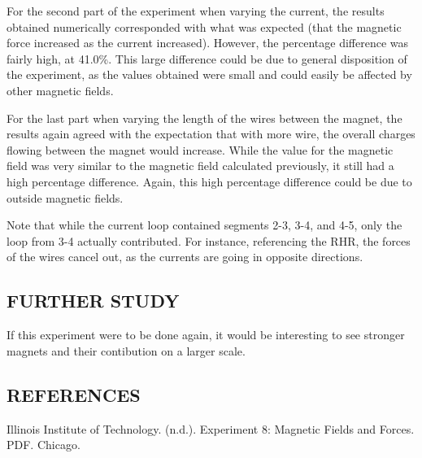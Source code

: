 \documentclass [12pt, letterpaper, twoside]{article}
\begin{document}
For the second part of the experiment when varying the current, the results obtained numerically corresponded with what was expected (that the magnetic force increased as the current increased). However, the percentage difference was fairly high, at 41.0\%. This large difference could be due to general disposition of the experiment, as the values obtained were small and could easily be affected by other magnetic fields. 

\noindent
For the last part when varying the length of the wires between the magnet, the results again agreed with the expectation that with more wire, the overall charges flowing between the magnet would increase. While the value for the magnetic field was very similar to the magnetic field calculated previously, it still had a high percentage difference. Again, this high percentage difference could be due to outside magnetic fields. 

\noindent
Note that while the current loop contained segments 2-3, 3-4, and 4-5, only the loop from 3-4 actually contributed. For instance, referencing the RHR, the forces of the wires cancel out, as the currents are going in opposite directions.

\subsection*{FURTHER STUDY}
If this experiment were to be done again, it would be interesting to see stronger magnets and their contibution on a larger scale.

\subsection*{REFERENCES}
Illinois Institute of Technology. (n.d.). Experiment 8: Magnetic Fields and Forces. PDF. Chicago.
\end{document}
